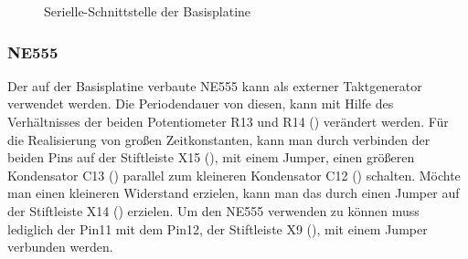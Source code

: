 \begin{figure}[H]
    \centering
    \qquad
    \qquad
    \caption[Serielle-Schnittstelle der Basisplatine]{Serielle-Schnittstelle der \gls{Basisplatine}}
    \label{fig:basisplatine-rs232}
\end{figure}

\subsubsection{NE555}
Der auf der \gls{Basisplatine} verbaute NE555 kann als externer Taktgenerator verwendet werden. Die Periodendauer von diesen, kann mit Hilfe des Verhältnisses der beiden Potentiometer R13 und R14 () verändert werden. Für die Realisierung von großen Zeitkonstanten, kann man durch verbinden der beiden Pins auf der Stiftleiste X15 (), mit einem Jumper, einen größeren Kondensator C13 () parallel zum kleineren Kondensator C12 () schalten. Möchte man einen kleineren Widerstand erzielen, kann man das durch einen Jumper auf der Stiftleiste X14 () erzielen. Um den NE555 verwenden zu können muss lediglich der Pin11 mit dem Pin12, der Stiftleiste X9 (), mit einem Jumper verbunden werden.

